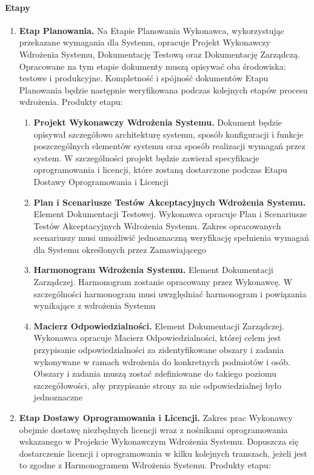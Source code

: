 \documentclass{article}
\begin{document}
\paragraph{Etapy}
\begin{enumerate}
\item \textbf{Etap Planowania.} 
Na Etapie Planowania Wykonawca, wykorzystując przekazane wymagania dla Systemu, opracuje Projekt Wykonawczy Wdrożenia Systemu, Dokumentację Testową oraz Dokumentację Zarządczą. Opracowane na tym etapie dokumenty muszą opisywać oba środowiska: testowe i produkcyjne. Kompletność i spójność dokumentów Etapu Planowania będzie następnie weryfikowana podczas kolejnych etapów procesu wdrożenia.
Produkty etapu:
\begin{enumerate}
\item \textbf{Projekt Wykonawczy Wdrożenia Systemu.}
Dokument będzie opisywał szczegółowo architekturę systemu, sposób konfiguracji i funkcje poszczególnych elementów systemu oraz sposób realizacji wymagań przez system. W szczególności projekt będzie zawierał specyfikacje oprogramowania i licencji, które zostaną dostarczone podczas Etapu Dostawy Oprogramowania i Licencji
\item \textbf{Plan i Scenariusze Testów Akceptacyjnych Wdrożenia Systemu.} 
Element Dokumentacji Testowej. Wykonawca opracuje Plan i Scenariusze Testów Akceptacyjnych Wdrożenia Systemu. Zakres opracowanych scenariuszy musi umożliwić jednoznaczną weryfikację spełnienia wymagań dla Systemu określonych przez Zamawiającego
\item \textbf{Harmonogram Wdrożenia Systemu.}
Element Dokumentacji Zarządczej. Harmonogram zostanie opracowany przez Wykonawcę. W szczególności harmonogram musi uwzględniać harmonogram i powiązania wynikające z wdrożenia Systemu
\item \textbf{Macierz Odpowiedzialności.}
Element Dokumentacji Zarządczej. Wykonawca opracuje Macierz Odpowiedzialności, której celem jest przypisanie odpowiedzialności za zidentyfikowane obszary i zadania wykonywane w ramach wdrożenia do konkretnych podmiotów i osób. Obszary i zadania muszą zostać zdefiniowane do takiego poziomu szczegółowości, aby przypisanie strony za nie odpowiedzialnej było jednoznaczne
\end{enumerate}
\item \textbf{Etap Dostawy Oprogramowania i Licencji.}
Zakres prac Wykonawcy obejmie dostawę niezbędnych licencji wraz z nośnikami oprogramowania wskazanego w Projekcie Wykonawczym Wdrożenia Systemu. Dopuszcza się dostarczenie licencji i oprogramowania w kilku kolejnych transzach, jeżeli jest to zgodne z Harmonogramem Wdrożenia Systemu. Produkty etapu:

\end{enumerate}
\end{document}
